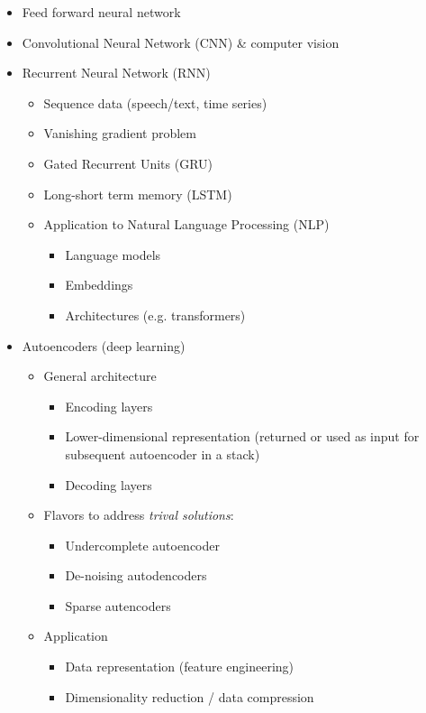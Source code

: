 \documentclass[10pt,landscape,letterpaper]{cheatsheet}
\begin{document}
\begin{multicols}{3}
\begin{itemize}
    \item Feed forward neural network
    \item Convolutional Neural Network (CNN) \& computer vision
    \item Recurrent Neural Network (RNN)
    \begin{itemize}
        \item Sequence data (speech/text, time series)
        \item Vanishing gradient problem
        \item Gated Recurrent Units (GRU)
        \item Long-short term memory (LSTM)
        \item Application to Natural Language Processing (NLP)
        \begin{itemize}
            \item Language models
            \item Embeddings
            \item Architectures (e.g. transformers)
        \end{itemize}
    \end{itemize}
    \item Autoencoders (deep learning)
    \begin{itemize}
        \item General architecture
        \begin{itemize}
            \item Encoding layers
            \item Lower-dimensional representation (returned or used as input for subsequent autoencoder in a stack)
            \item Decoding layers
        \end{itemize}
        \item Flavors to address \emph{trival solutions}:
        \begin{itemize}
            \item Undercomplete autoencoder
            \item De-noising autodencoders
            \item Sparse autencoders
        \end{itemize}
        \item Application
        \begin{itemize}
            \item Data representation (feature engineering)
            \item Dimensionality reduction / data compression
        \end{itemize}
\end{itemize}
\end{itemize}


\end{multicols}
\end{document}
